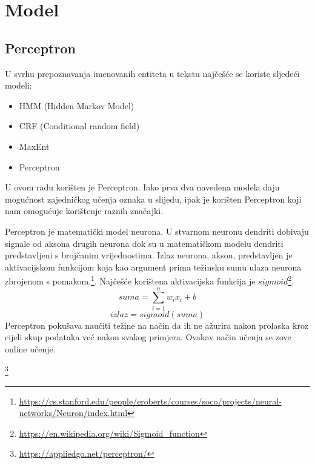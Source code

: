 \documentclass[times, utf8, seminar]{fer}
\begin{document}
\chapter{Model}
\section{Perceptron}
U svrhu prepoznavanja imenovanih entiteta u tekstu najčešće se koriste sljedeći modeli: 
\begin{itemize}
\item HMM (Hidden Markov Model)
\item CRF (Conditional random field)
\item MaxEnt
\item Perceptron
\end{itemize}

U ovom radu korišten je Perceptron. Iako prva dva navedena modela daju mogućnost zajedničkog učenja oznaka u slijedu, ipak je korišten Perceptron koji nam omogućuje korištenje raznih značajki.

\indent Perceptron je matematički model neurona. U stvarnom neuronu dendriti dobivaju signale od aksona drugih neurona dok su u matematičkom modelu dendriti predstavljeni s brojčanim vrijednostima. Izlaz neurona, akson, predstavljen je aktivacijskom funkcijom koja kao argument prima težinsku sumu ulaza neurona zbrojenom s pomakom.\footnote{\url{https://cs.stanford.edu/people/eroberts/courses/soco/projects/neural-networks/Neuron/index.html}}. Najčešće korištena aktivacijska funkcija je $ sigmoid $\footnote{\url{https://en.wikipedia.org/wiki/Sigmoid_function}}.
\[ suma = \sum_{i=1}^{n} w_ix_i + b\]
\[ izlaz = sigmoid(suma) \]
Perceptron pokušava naučiti težine na način da ih ne ažurira nakon prolaska kroz cijeli skup podataka već nakon svakog primjera. Ovakav način učenja se zove online učenje.  
\newpage
\begin{center}
\footnote{\url{https://appliedgo.net/perceptron/}}
\end{center}
\end{document}
